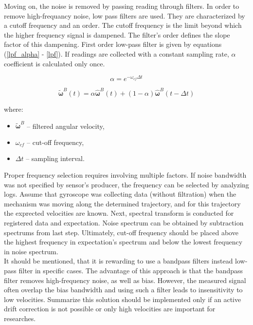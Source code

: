 Moving on, the noise is removed by passing reading through filters. In order to remove high-frequancy noise, low pass filters are used. They are characterized by a cutoff frequency and an order. The cutoff frequency is the limit beyond which the higher frequency signal is dampened. The filter's order defines the slope factor of this dampening. First order low-pass filter is given by equations (\ref{lpf_alpha} - \ref{lpf}). If readings are collected with a constant sampling rate, $\alpha$ coefficient is calculated only once.

\begin{equation}
	 \alpha = e^{ - \omega_{cf} \Delta t}
	\label{lpf_alpha}
\end{equation}

\begin{equation}
	\bm{\tilde{\omega}}^B(t) = \alpha  \bm{\hat{\omega}}^B(t) + \left( 1 - \alpha \right) \bm{\hat{\omega}}^B(t - \Delta t)
	\label{lpf}
\end{equation}

where:
\begin{itemize}
	\item $\bm{\tilde{\omega}}^B$ -- filtered angular velocity,
	\item $\omega_{cf}$ -- cut-off frequency,
	\item $\Delta t$ -- sampling interval.
\end{itemize}

Proper frequency selection requires involving multiple factors. If noise bandwidth was not specified by sensor's producer, the frequency can be selected by analyzing logs. Assume that gyroscope was collecting data (without filtration) when the mechanism was moving along the determined trajectory, and for this trajectory the exprected velocities are known. Next, spectral transform is conducted for registered data and expectation. Noise spectrum can be obtained by subtraction spectrums from last step. Ultimately, cut-off frequency should be placed above the highest frequency in expectation's spectrum and below the lowest frequency in noise spectrum.\\

It should be mentioned, that it is rewarding to use a bandpass filters instead low-pass filter in specific cases. The advantage of this approach is that the bandpass filter removes high-frequency noise, as well as bias. However, the measured signal often overlap the bias bandwidth and using such a filter leads to insensitivity to low velocities. Summarize this solution should be implemented only if an active drift correction is not possible or only high velocities are important for researches.


